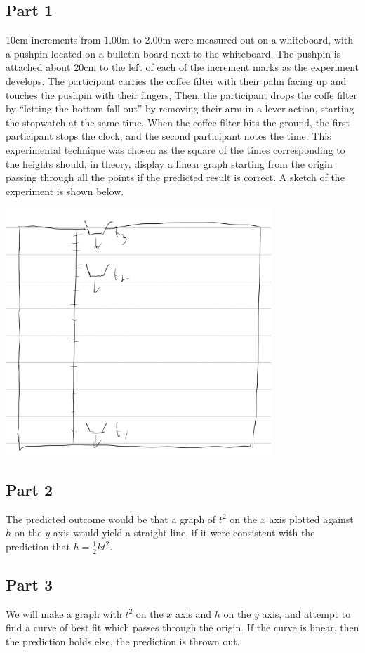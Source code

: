 \documentclass[8pt]{extarticle}
\begin{document}
{\subsection*{Part 1}%
10cm increments from $1.00$m to $2.00$m were measured out on a whiteboard, with a pushpin located on a bulletin board next to the whiteboard. The pushpin is attached about 20cm to the left of each of the increment marks as the experiment develops. The participant carries the coffee filter with their palm facing up and touches the pushpin with their fingers, Then, the participant drops the coffe filter by ``letting the bottom fall out'' by removing their arm in a lever action, starting the stopwatch at the same time. When the coffee filter hits the ground, the first participant stops the clock, and the second participant notes the time. This experimental technique was chosen as the square of the times corresponding to the heights should, in theory, display a linear graph starting from the origin passing through all the points if the predicted result is correct. A sketch of the experiment is shown below.
\begin{center}
	\includegraphics[width=10cm]{Lab6Image1_1}
\end{center}
\subsection*{Part 2}%
The predicted outcome would be that a graph of $t^2$ on the $x$ axis plotted against $h$ on the $y$ axis would yield a straight line, if it were consistent with the prediction that $h = \frac{1}{2}kt^2 $.
\subsection*{Part 3}%
We will make a graph with $t^2$ on the $x$ axis and $h$ on the $y$ axis, and attempt to find a curve of best fit which passes through the origin. If the curve is linear, then the prediction holds \textendash else, the prediction is thrown out.
}
\end{document}
